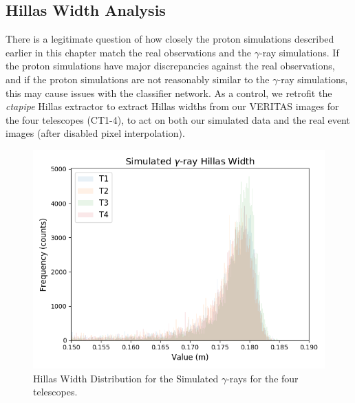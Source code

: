 \subsection{Hillas Width Analysis}
There is a legitimate question of how closely the proton simulations described earlier in this chapter match the real observations and the $\gamma$-ray simulations. If the proton simulations have major discrepancies against the real observations, and if the proton simulations are not reasonably similar to the $\gamma$-ray simulations, this may cause issues with the classifier network. As a control, we retrofit the \textit{ctapipe} Hillas extractor to extract Hillas widths from our VERITAS images for the four telescopes (CT1-4), to act on both our simulated data and the real event images (after disabled pixel interpolation).
\begin{figure}[ht] 
        \centering \includegraphics[width=\columnwidth]{figures/Gamma2_int.png}

        \caption{
                \label{fig:Gamma2_int} Hillas Width Distribution for the Simulated $\gamma$-rays for the four telescopes.
        }
\end{figure}
